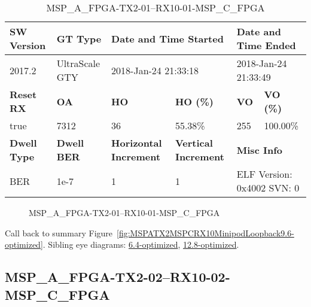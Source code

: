 \begin{table}[h]
\centering
\caption{MSP\_A\_FPGA-TX2-01--RX10-01-MSP\_C\_FPGA}
\label{tab:MSPAFPGATX201RX1001MSPCFPGA9.6-optimized}
\begin{tabular}{@{}|l|l|l|l|l|l|@{}}
\toprule
\textbf{SW Version}                & \textbf{GT Type}   & \multicolumn{2}{l|}{\textbf{Date and Time Started}}            & \multicolumn{2}{l|}{\textbf{Date and Time Ended}}        \\ \midrule
2017.2                       & UltraScale GTY          & \multicolumn{2}{l|}{2018-Jan-24 21:33:18}                   & \multicolumn{2}{l|}{2018-Jan-24 21:33:49}               \\ \midrule
\textbf{Reset RX}                  & \textbf{OA} & \textbf{HO}   & \textbf{HO (\%)} & \textbf{VO} & \textbf{VO (\%)} \\ \midrule
true & 7312        & 36          & 55.38\%        & 255        & 100.00\%       \\ \midrule
\textbf{Dwell Type}                & \textbf{Dwell BER} & \textbf{Horizontal Increment} & \textbf{Vertical Increment}    & \multicolumn{2}{l|}{\textbf{Misc Info}}                  \\ \midrule
BER                            & 1e-7        & 1        & 1           & \multicolumn{2}{l|}{ELF Version: 0x4002 SVN: 0}                         \\ \bottomrule
\end{tabular}
\end{table}

\begin{figure}[h]
\caption{MSP\_A\_FPGA-TX2-01--RX10-01-MSP\_C\_FPGA} \label{fig:MSPAFPGATX201RX1001MSPCFPGA9.6-optimized}
\end{figure}

Call back to summary Figure~\ref{fig:MSPATX2MSPCRX10MinipodLoopback9.6-optimized}.
Sibling eye diagrams: \hyperref[sec:MSPAFPGATX201RX1001MSPCFPGA6.4-optimized]{6.4-optimized}, \hyperref[sec:MSPAFPGATX201RX1001MSPCFPGA12.8-optimized]{12.8-optimized}.

\clearpage
\newpage


\subsection{MSP\_A\_FPGA-TX2-02--RX10-02-MSP\_C\_FPGA}\label{sec:MSPAFPGATX202RX1002MSPCFPGA9.6-optimized}

